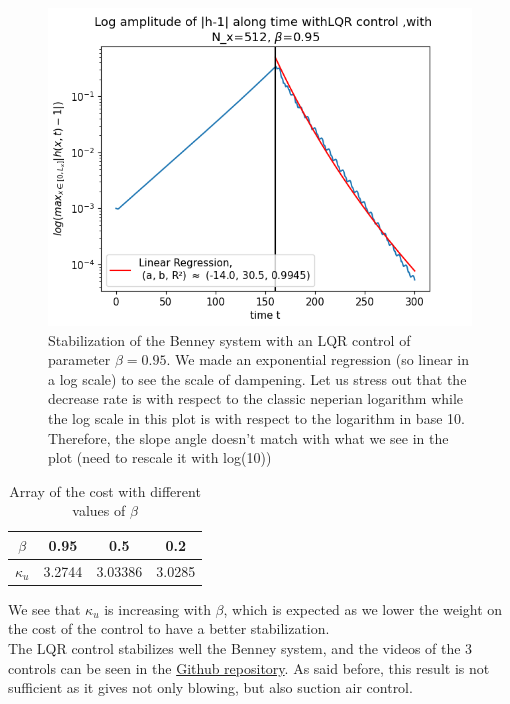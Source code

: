 \documentclass[12pt]{article}
\begin{document}
\begin{figure}
    \centering
    \includegraphics[width=0.5\linewidth]{Control_experiments/LQR_beta_0.95.png}
    \caption{Stabilization of the Benney system with an LQR control of parameter $\beta=0.95$.
    We made an exponential regression (so linear in a log scale) to see the scale of dampening.
    Let us stress out that the decrease rate is with respect to the classic neperian logarithm
    while the log scale in this plot is with respect to the logarithm in base 10. Therefore,
    the slope angle doesn't match with what we see in the plot (need to rescale it with log(10)) }
    \label{fig:LQR_beta_0.95}
\end{figure}
\vspace{0.5cm}


\begin{table}[ht]
    \caption{Array of the cost with different values of $\beta$}
    \label{tab:LQR_cost_beta}
    \centering
        \begin{tabular}{ |c|c|c|c| }
        \hline
             $\beta$ & 0.95 & 0.5 & 0.2  \\
        \hline
        $\kappa_u$ & 3.2744 & 3.03386 & 3.0285 \\ 

        \hline
        \end{tabular}
\end{table}

We see that $\kappa_u$ is increasing with $\beta$, which is expected as we lower the weight
on the cost of the control to have a better stabilization.\\

The LQR control stabilizes well the Benney system, and the videos of the 3 controls can be seen in the 
\href{https://github.com/Bilal59170/Repo_Warwick_internship}{Github repository}. As said before, 
this result is not sufficient as it gives not only blowing, but also suction air control. 
\\
\end{document}

